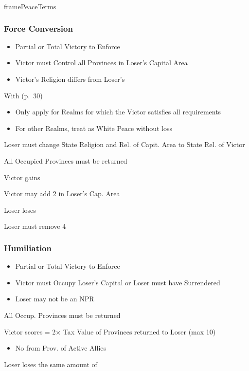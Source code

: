 \documentclass[10pt]{article}
\newlength{\fhPeaceTerms} \setlength\fhPeaceTerms{45.5\baselineskip}
\begin{document}
\begin{dynamiccontents*}{framePeaceTerms}
\begin{eubox}{\fhPeaceTerms}
\begin{multicols}{3}
		\subsubsection*{Force Conversion}
		\begin{itemize}
			{
				\color{peaceReqColor}
				\item {}
				\begin{itemize}
					\item Partial or Total Victory to Enforce
					\item Victor must Control all Provinces in Loser's Capital Area
					\item Victor's Religion differs from Loser's
				\end{itemize}
			}
			\item With  (p.~30)
			\begin{itemize}
				\item Only apply for Realms for which the Victor satisfies all requirements
				\item For other Realms, treat as White Peace without \prestige loss
			\end{itemize}
			\item Loser must change State Religion and Rel. of Capit. Area to State Rel. of Victor
			\item All Occupied Provinces must be returned
			\item Victor gains 
			\item Victor may add 2 \influence in Loser's Cap. Area
			\item Loser loses 
			\item Loser must remove 4 \influence
		\end{itemize}

		\subsubsection*{Humiliation}
		\begin{itemize}
			{
				\color{peaceReqColor}
				\item \strong{Requirements}
				\begin{itemize}
					\item Partial or Total Victory to Enforce
					\item Victor must Occupy Loser's Capital or Loser must have Surrendered
					\item Loser may not be an NPR
				\end{itemize}
			}
			\item All Occup. Provinces must be returned
			\item Victor scores \prestige = 2× Tax Value of Provinces returned to Loser (max 10)
			\begin{itemize}
				\item No \prestige from Prov. of Active Allies
			\end{itemize}
			\item Loser loses the same amount of \prestige
		\end{itemize}


\end{multicols}
\end{eubox}
\end{dynamiccontents*}
\end{document}
